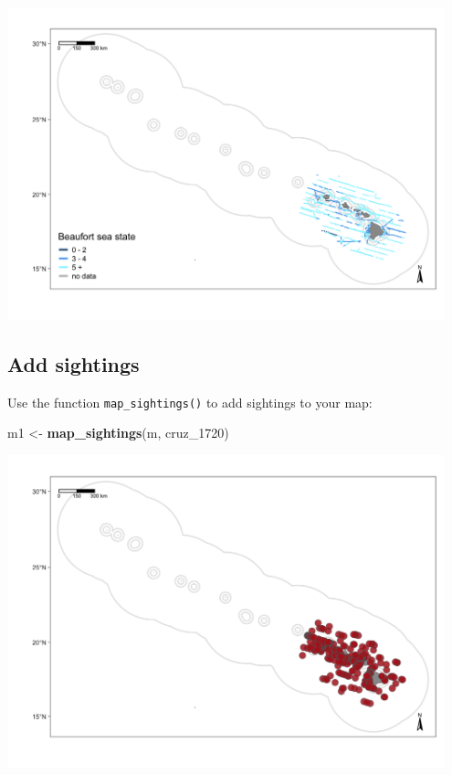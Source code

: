 \documentclass[
]{book}
\newenvironment{Shaded}{\begin{snugshade}}{\end{snugshade}}
\newcommand{\DecValTok}[1]{\textcolor[rgb]{0.00,0.00,0.81}{#1}}
\newcommand{\KeywordTok}[1]{\textcolor[rgb]{0.13,0.29,0.53}{\textbf{#1}}}
\newcommand{\NormalTok}[1]{#1}
\newcommand{\StringTok}[1]{\textcolor[rgb]{0.31,0.60,0.02}{#1}}
\begin{document}
\includegraphics[width=0.95\textwidth,height=\textheight]{img/map_tracks3.png}

\hypertarget{add-sightings}{%
\subsection*{Add sightings}\label{add-sightings}}

Use the function \texttt{map\_sightings()} to add sightings to your map:

\begin{Shaded}
\begin{Highlighting}[]
\NormalTok{m1 <-}\StringTok{ }\KeywordTok{map_sightings}\NormalTok{(m, cruz_}\DecValTok{1720}\NormalTok{)}
\end{Highlighting}
\end{Shaded}

\includegraphics[width=0.95\textwidth,height=\textheight]{img/map_sits.png}
\end{document}
